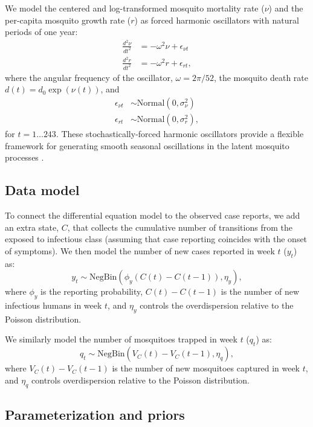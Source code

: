 \documentclass[10pt,letterpaper]{article}
\begin{document}
We model the centered and log-transformed mosquito mortality rate ($\nu$) and the per-capita mosquito growth rate ($r$) as forced harmonic oscillators with natural periods of one year:
\begin{align}
\frac{d^2\nu}{dt^2} &= -\omega^2 \nu + \epsilon_{\nu t}\\
\frac{d^2 r}{dt^2} &= -\omega^2 r + \epsilon_{rt},
\end{align}
where the angular frequency of the oscillator, $\omega = 2\pi / 52$, the mosquito death rate $d(t) = d_0 \exp(\nu(t))$, and
\begin{align}
\epsilon_{\nu t} & \sim \text{Normal}(0, \sigma^2_{\nu})\\
\epsilon_{rt} & \sim \text{Normal}(0, \sigma^2_r),
\end{align}
for $t = 1 \dots 243$.
These stochastically-forced harmonic oscillators provide a flexible framework for generating smooth seasonal oscillations in the latent mosquito processes \cite{Ramsay2017}.

\subsection*{Data model}

To connect the differential equation model to the observed case reports, we add an extra state, $C$, that collects the cumulative number of transitions from the exposed to infectious class (assuming that case reporting coincides with the onset of symptoms).
We then model the number of new cases reported in week $t$ ($y_t$) as:
\begin{equation}
y_t  \sim \text{NegBin}(\phi_y (C(t) - C(t-1)), \eta_y),
\end{equation}
where $\phi_y$ is the reporting probability, $C(t) - C(t-1)$ is the number of new infectious humans in week $t$, and $\eta_y$ controls the overdispersion relative to the Poisson distribution.

We similarly model the number of mosquitoes trapped in week $t$ ($q_t$) as:
\begin{equation}
q_t \sim \text{NegBin}(V_{C}(t) - V_{C}(t-1), \eta_q),
\end{equation}
where $V_{C}(t) - V_{C}(t-1)$ is the number of new mosquitoes captured in week $t$, and $\eta_q$ controls overdispersion relative to the Poisson distribution.

\subsection*{Parameterization and priors}
\end{document}
